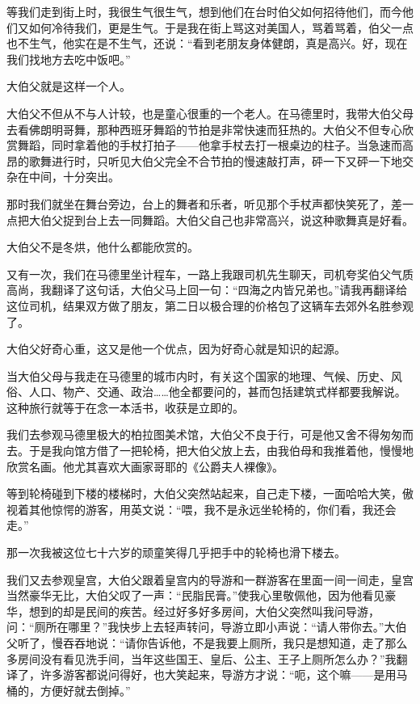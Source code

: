 \par 等我们走到街上时，我很生气很生气，想到他们在台时伯父如何招待他们，而今他们又如何冷待我们，更是生气。于是我在街上骂这对美国人，骂着骂着，伯父一点也不生气，他实在是不生气，还说：“看到老朋友身体健朗，真是高兴。好，现在我们找地方去吃中饭吧。”
\par 大伯父就是这样一个人。
\par 大伯父不但从不与人计较，也是童心很重的一个老人。在马德里时，我带大伯父母去看佛朗明哥舞，那种西班牙舞蹈的节拍是非常快速而狂热的。大伯父不但专心欣赏舞蹈，同时拿着他的手杖打拍子——他拿手杖去打一根桌边的柱子。当急速而高昂的歌舞进行时，只听见大伯父完全不合节拍的慢速敲打声，砰一下又砰一下地交杂在中间，十分突出。
\par 那时我们就坐在舞台旁边，台上的舞者和乐者，听见那个手杖声都快笑死了，差一点把大伯父捉到台上去一同舞蹈。大伯父自己也非常高兴，说这种歌舞真是好看。
\par 大伯父不是冬烘，他什么都能欣赏的。
\par 又有一次，我们在马德里坐计程车，一路上我跟司机先生聊天，司机夸奖伯父气质高尚，我翻译了这句话，大伯父马上回一句：“四海之内皆兄弟也。”请我再翻译给这位司机，结果双方做了朋友，第二日以极合理的价格包了这辆车去郊外名胜参观了。
\par 大伯父好奇心重，这又是他一个优点，因为好奇心就是知识的起源。
\par 当大伯父母与我走在马德里的城市内时，有关这个国家的地理、气候、历史、风俗、人口、物产、交通、政治……他全都要问的，甚而包括建筑式样都要我解说。这种旅行就等于在念一本活书，收获是立即的。
\par 我们去参观马德里极大的柏拉图美术馆，大伯父不良于行，可是他又舍不得匆匆而去。于是我向馆方借了一把轮椅，把大伯父放上去，由我伯母和我推着他，慢慢地欣赏名画。他尤其喜欢大画家哥耶的《公爵夫人裸像》。
\par 等到轮椅碰到下楼的楼梯时，大伯父突然站起来，自己走下楼，一面哈哈大笑，傲视着其他惊愕的游客，用英文说：“喂，我不是永远坐轮椅的，你们看，我还会走。”
\par 那一次我被这位七十六岁的顽童笑得几乎把手中的轮椅也滑下楼去。
\par 我们又去参观皇宫，大伯父跟着皇宫内的导游和一群游客在里面一间一间走，皇宫当然豪华无比，大伯父叹了一声：“民脂民膏。”使我心里敬佩他，因为他看见豪华，想到的却是民间的疾苦。经过好多好多房间，大伯父突然叫我问导游，问：“厕所在哪里？”我快步上去轻声转问，导游立即小声说：“请人带你去。”大伯父听了，慢吞吞地说：“请你告诉他，不是我要上厕所，我只是想知道，走了那么多房间没有看见洗手间，当年这些国王、皇后、公主、王子上厕所怎么办？”我翻译了，许多游客都说问得好，也大笑起来，导游方才说：“呃，这个嘛——是用马桶的，方便好就去倒掉。”
